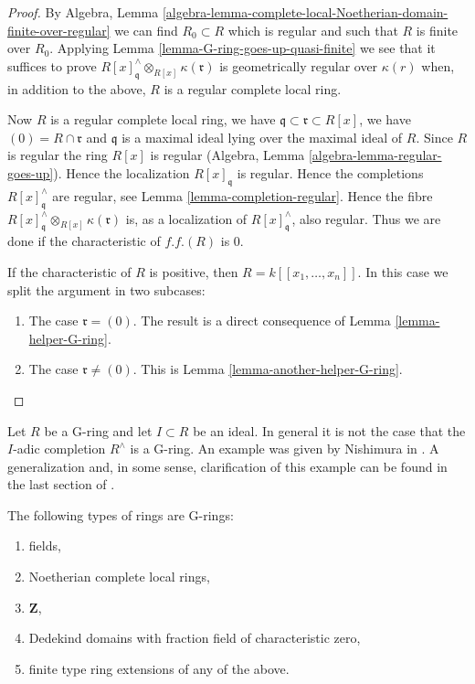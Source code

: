 \begin{proof}
\medskip\noindent
By  Algebra, Lemma
\ref{algebra-lemma-complete-local-Noetherian-domain-finite-over-regular}
we can find $R_0 \subset R$ which is regular and such that $R$ is
finite over $R_0$. Applying Lemma \ref{lemma-G-ring-goes-up-quasi-finite}
we see that it suffices to prove
$R[x]_\mathfrak q^\wedge \otimes_{R[x]} \kappa(\mathfrak r)$
is geometrically regular over $\kappa(r)$ when, in addition to the above,
$R$ is a regular complete local ring.

\medskip\noindent
Now $R$ is a regular complete local ring, we have
$\mathfrak q \subset \mathfrak r \subset R[x]$, we have
$(0) = R \cap \mathfrak r$ and $\mathfrak q$ is a maximal ideal
lying over the maximal ideal of $R$. Since $R$ is regular the
ring $R[x]$ is regular (Algebra, Lemma \ref{algebra-lemma-regular-goes-up}).
Hence the localization $R[x]_\mathfrak q$ is regular.
Hence the completions $R[x]_\mathfrak q^\wedge$ are regular, see
Lemma \ref{lemma-completion-regular}.
Hence the fibre $R[x]_{\mathfrak q}^\wedge \otimes_{R[x]} \kappa(\mathfrak r)$
is, as a localization of $R[x]_\mathfrak q^\wedge$, also regular.
Thus we are done if the characteristic of $f.f.(R)$ is $0$.

\medskip\noindent
If the characteristic of $R$ is positive, then $R = k[[x_1, \ldots, x_n]]$.
In this case we split the argument in two subcases:
\begin{enumerate}
\item The case $\mathfrak r = (0)$. The result is a direct consequence
of Lemma \ref{lemma-helper-G-ring}.
\item The case $\mathfrak r \not = (0)$. This is
Lemma \ref{lemma-another-helper-G-ring}.
\end{enumerate}
\end{proof}

\begin{remark}
\label{remark-G-does-not-survive-completion}
Let $R$ be a G-ring and let $I \subset R$ be an ideal.
In general it is not the case that the $I$-adic completion $R^\wedge$
is a G-ring. An example was given by Nishimura in \cite{Nishimura}.
A generalization and, in some sense, clarification of this example can
be found in the last section of \cite{Dumitrescu}.
\end{remark}

\begin{proposition}
\label{proposition-ubiquity-G-ring}
The following types of rings are G-rings:
\begin{enumerate}
\item fields,
\item Noetherian complete local rings,
\item $\mathbf{Z}$,
\item Dedekind domains with fraction field of characteristic zero,
\item finite type ring extensions of any of the above.
\end{enumerate}
\end{proposition}

